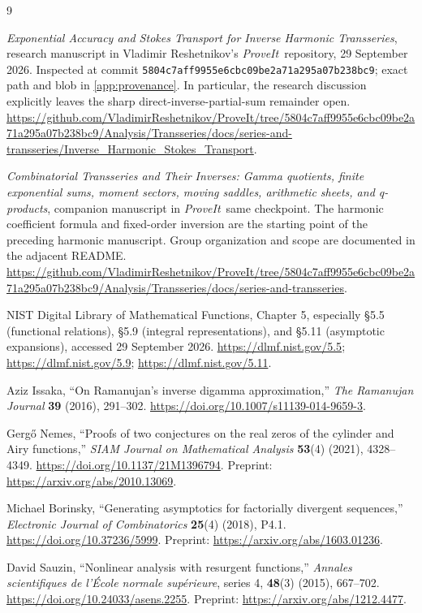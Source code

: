 \documentclass[11pt,a4paper]{article}
\theoremstyle{definition}
\numberwithin{equation}{section}
\newcommand{\repo}{\textit{ProveIt}}
\begin{document}
\clearpage
\begin{thebibliography}{9}

\emph{Exponential Accuracy and Stokes Transport for Inverse Harmonic Transseries}, research manuscript in Vladimir Reshetnikov's \repo\ repository, 29 September 2026. Inspected at commit
\texttt{5804c7aff9955e6cbc09be2a71a295a07b238bc9}; exact path and blob in \cref{app:provenance}. In particular, the research discussion explicitly leaves the sharp direct-inverse-partial-sum remainder open.
\url{https://github.com/VladimirReshetnikov/ProveIt/tree/5804c7aff9955e6cbc09be2a71a295a07b238bc9/Analysis/Transseries/docs/series-and-transseries/Inverse_Harmonic_Stokes_Transport}.

\emph{Combinatorial Transseries and Their Inverses: Gamma quotients, finite exponential sums, moment sectors, moving saddles, arithmetic sheets, and q-products}, companion manuscript in \repo\, same checkpoint. The harmonic coefficient formula and fixed-order inversion are the starting point of the preceding harmonic manuscript. Group organization and scope are documented in the adjacent README.
\url{https://github.com/VladimirReshetnikov/ProveIt/tree/5804c7aff9955e6cbc09be2a71a295a07b238bc9/Analysis/Transseries/docs/series-and-transseries}.

NIST Digital Library of Mathematical Functions, Chapter 5, especially \S5.5 (functional relations), \S5.9 (integral representations), and \S5.11 (asymptotic expansions), accessed 29 September 2026.
\url{https://dlmf.nist.gov/5.5};
\url{https://dlmf.nist.gov/5.9};
\url{https://dlmf.nist.gov/5.11}.

Aziz Issaka, ``On Ramanujan's inverse digamma approximation,''
\emph{The Ramanujan Journal} \textbf{39} (2016), 291--302.
\url{https://doi.org/10.1007/s11139-014-9659-3}.

Gerg\H{o} Nemes, ``Proofs of two conjectures on the real zeros of the cylinder and Airy functions,''
\emph{SIAM Journal on Mathematical Analysis} \textbf{53}(4) (2021), 4328--4349.
\url{https://doi.org/10.1137/21M1396794}.
Preprint: \url{https://arxiv.org/abs/2010.13069}.

Michael Borinsky, ``Generating asymptotics for factorially divergent sequences,''
\emph{Electronic Journal of Combinatorics} \textbf{25}(4) (2018), P4.1.
\url{https://doi.org/10.37236/5999}.
Preprint: \url{https://arxiv.org/abs/1603.01236}.

David Sauzin, ``Nonlinear analysis with resurgent functions,''
\emph{Annales scientifiques de l'\'Ecole normale sup\'erieure}, series 4,
\textbf{48}(3) (2015), 667--702.
\url{https://doi.org/10.24033/asens.2255}.
Preprint: \url{https://arxiv.org/abs/1212.4477}.

\end{thebibliography}
\end{document}
